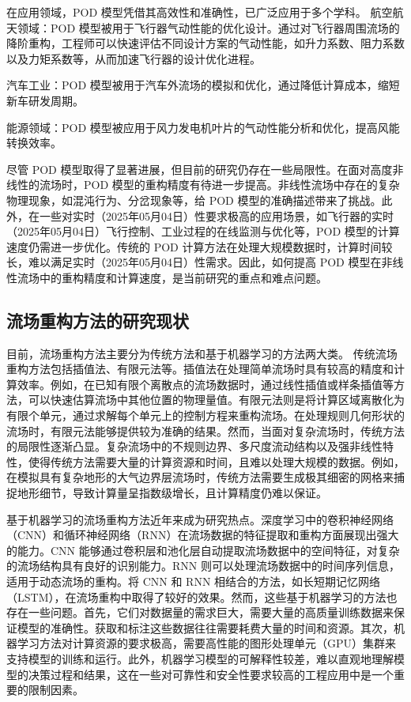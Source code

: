 在应用领域，POD 模型凭借其高效性和准确性，已广泛应用于多个学科。
 航空航天领域：POD 模型被用于飞行器气动性能的优化设计\cite{LeGresley2006}。通过对飞行器周围流场的降阶重构，工程师可以快速评估不同设计方案的气动性能，如升力系数、阻力系数以及力矩系数等，从而加速飞行器的设计优化进程。
 
 汽车工业：POD 模型被用于汽车外流场的模拟和优化\cite{Bergmann2018}，通过降低计算成本，缩短新车研发周期。
 
 能源领域：POD 模型被应用于风力发电机叶片的气动性能分析和优化\cite{Couplet2003}，提高风能转换效率。
 
 尽管 POD 模型取得了显著进展，但目前的研究仍存在一些局限性。在面对高度非线性的流场时，POD 模型的重构精度有待进一步提高\cite{Holmes2012}。非线性流场中存在的复杂物理现象，如混沌行为、分岔现象等，给 POD 模型的准确描述带来了挑战\cite{Noack2003}。此外，在一些对实时（2025年05月04日）性要求极高的应用场景，如飞行器的实时（2025年05月04日）飞行控制、工业过程的在线监测与优化等，POD 模型的计算速度仍需进一步优化\cite{Peherstorfer2021}。传统的 POD 计算方法在处理大规模数据时，计算时间较长，难以满足实时（2025年05月04日）性需求。因此，如何提高 POD 模型在非线性流场中的重构精度和计算速度，是当前研究的重点和难点问题\cite{Carlberg2023}。

\subsection{流场重构方法的研究现状}
目前，流场重构方法主要分为传统方法和基于机器学习的方法两大类。
传统流场重构方法包括插值法、有限元法等。插值法在处理简单流场时具有较高的精度和计算效率\cite{Press2007}。例如，在已知有限个离散点的流场数据时，通过线性插值或样条插值等方法，可以快速估算流场中其他位置的物理量值\cite{Boyd2001}。有限元法则是将计算区域离散化为有限个单元，通过求解每个单元上的控制方程来重构流场\cite{Zienkiewicz2013}。在处理规则几何形状的流场时，有限元法能够提供较为准确的结果\cite{Bathe2014}。然而，当面对复杂流场时，传统方法的局限性逐渐凸显。复杂流场中的不规则边界、多尺度流动结构以及强非线性特性，使得传统方法需要大量的计算资源和时间，且难以处理大规模的数据\cite{Taylor2013}。例如，在模拟具有复杂地形的大气边界层流场时，传统方法需要生成极其细密的网格来捕捉地形细节，导致计算量呈指数级增长，且计算精度仍难以保证\cite{Moin2012}。

基于机器学习的流场重构方法近年来成为研究热点。深度学习中的卷积神经网络（CNN）和循环神经网络（RNN）在流场数据的特征提取和重构方面展现出强大的能力\cite{Goodfellow2016}。CNN 能够通过卷积层和池化层自动提取流场数据中的空间特征，对复杂的流场结构具有良好的识别能力\cite{Krizhevsky2012}。RNN 则可以处理流场数据中的时间序列信息，适用于动态流场的重构\cite{Hochreiter1997}。将 CNN 和 RNN 相结合的方法，如长短期记忆网络（LSTM），在流场重构中取得了较好的效果\cite{Graves2013}。然而，这些基于机器学习的方法也存在一些问题。首先，它们对数据量的需求巨大，需要大量的高质量训练数据来保证模型的准确性\cite{LeCun2015}。获取和标注这些数据往往需要耗费大量的时间和资源\cite{Sun2021}。其次，机器学习方法对计算资源的要求极高，需要高性能的图形处理单元（GPU）集群来支持模型的训练和运行\cite{Schmidhuber2015}。此外，机器学习模型的可解释性较差，难以直观地理解模型的决策过程和结果\cite{Rudin2019}，这在一些对可靠性和安全性要求较高的工程应用中是一个重要的限制因素\cite{Arrieta2020}。

